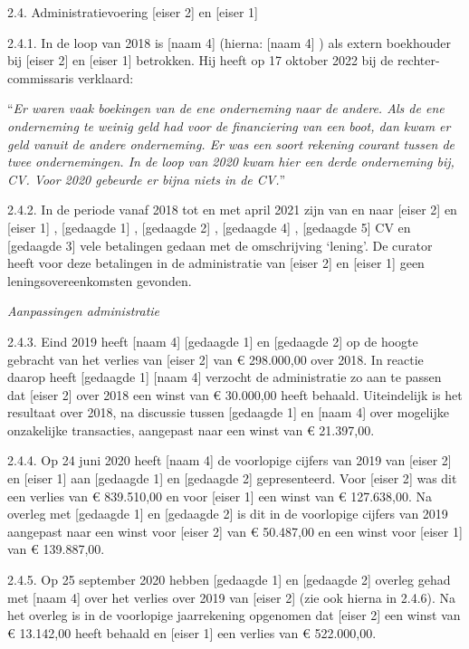 \documentclass[
  dutch,
  a4paper,
]{article}
\begin{document}
2.4. Administratievoering {[}eiser 2{]} en {[}eiser 1{]}

2.4.1. In de loop van 2018 is {[}naam 4{]} (hierna: {[}naam 4{]} ) als extern boekhouder bij {[}eiser 2{]} en {[}eiser 1{]} betrokken. Hij heeft op 17 oktober 2022 bij de rechter-commissaris verklaard:

``\emph{Er waren vaak boekingen van de ene onderneming naar de andere. Als de ene onderneming te weinig geld had voor de financiering van een boot, dan kwam er geld vanuit de andere onderneming. Er was een soort rekening courant tussen de twee ondernemingen. In de loop van 2020 kwam hier een derde onderneming bij, CV. Voor 2020 gebeurde er bijna niets in de CV.}''

2.4.2. In de periode vanaf 2018 tot en met april 2021 zijn van en naar {[}eiser 2{]} en {[}eiser 1{]} , {[}gedaagde 1{]} , {[}gedaagde 2{]} , {[}gedaagde 4{]} , {[}gedaagde 5{]} CV en {[}gedaagde 3{]} vele betalingen gedaan met de omschrijving `lening'. De curator heeft voor deze betalingen in de administratie van {[}eiser 2{]} en {[}eiser 1{]} geen leningsovereenkomsten gevonden.

\emph{Aanpassingen administratie}

2.4.3. Eind 2019 heeft {[}naam 4{]} {[}gedaagde 1{]} en {[}gedaagde 2{]} op de hoogte gebracht van het verlies van {[}eiser 2{]} van € 298.000,00 over 2018. In reactie daarop heeft {[}gedaagde 1{]} {[}naam 4{]} verzocht de administratie zo aan te passen dat {[}eiser 2{]} over 2018 een winst van € 30.000,00 heeft behaald. Uiteindelijk is het resultaat over 2018, na discussie tussen {[}gedaagde 1{]} en {[}naam 4{]} over mogelijke onzakelijke transacties, aangepast naar een winst van € 21.397,00.

2.4.4. Op 24 juni 2020 heeft {[}naam 4{]} de voorlopige cijfers van 2019 van {[}eiser 2{]} en {[}eiser 1{]} aan {[}gedaagde 1{]} en {[}gedaagde 2{]} gepresenteerd. Voor {[}eiser 2{]} was dit een verlies van € 839.510,00 en voor {[}eiser 1{]} een winst van € 127.638,00. Na overleg met {[}gedaagde 1{]} en {[}gedaagde 2{]} is dit in de voorlopige cijfers van 2019 aangepast naar een winst voor {[}eiser 2{]} van € 50.487,00 en een winst voor {[}eiser 1{]} van € 139.887,00.

2.4.5. Op 25 september 2020 hebben {[}gedaagde 1{]} en {[}gedaagde 2{]} overleg gehad met {[}naam 4{]} over het verlies over 2019 van {[}eiser 2{]} (zie ook hierna in 2.4.6). Na het overleg is in de voorlopige jaarrekening opgenomen dat {[}eiser 2{]} een winst van € 13.142,00 heeft behaald en {[}eiser 1{]} een verlies van € 522.000,00.
\end{document}
